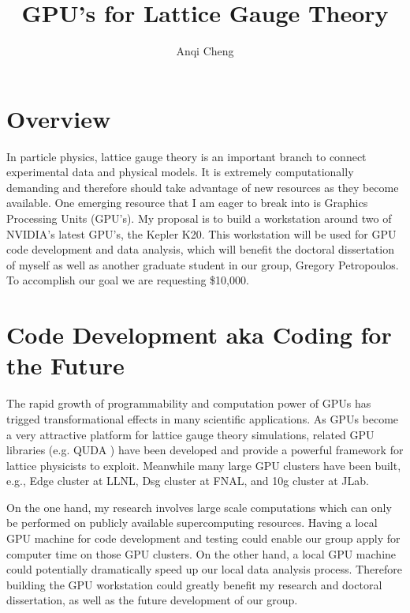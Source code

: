 \documentclass[11pt]{article}
\begin{document}
  \title{GPU's for Lattice Gauge Theory}
  \author{Anqi Cheng}
  \maketitle

  \section*{Overview} %
  In particle physics, lattice gauge theory is an important branch to connect experimental data and physical models.
  It is extremely computationally demanding and therefore should take advantage of new  resources as they become available.
  One emerging resource that I am eager to break into is Graphics Processing Units (GPU's).   
  My proposal is to build a workstation around two of NVIDIA's latest GPU's, the Kepler K20.  
  This workstation will be used for GPU code development and data analysis, which will benefit the doctoral dissertation of myself as well as another 
  graduate student in our group, Gregory Petropoulos. 
  To accomplish our goal we are requesting \$10,000.  
  
  \section*{Code Development aka Coding for the Future} %
  The rapid growth of programmability and computation power of GPUs has trigged transformational effects in many scientific applications. 
  As GPUs become a very attractive platform for lattice gauge theory simulations, related GPU libraries (e.g. QUDA \cite{QUDA1,QUDA2,QUDA3}) have been developed and provide a powerful framework for lattice physicists to exploit.
  Meanwhile many large GPU clusters have been built, e.g., Edge cluster at LLNL, Dsg cluster at FNAL, and 10g cluster at JLab.

  On the one hand, my research involves large scale computations which can only be performed on publicly available supercomputing resources. 
  Having a local GPU machine for code development and testing could enable our group apply for computer time on those GPU clusters.
  On the other hand, a local GPU machine could potentially dramatically speed up our local data analysis process.
  Therefore building the GPU workstation could greatly benefit my research and doctoral dissertation, as well as the future development of our group.
 
\end{document}
